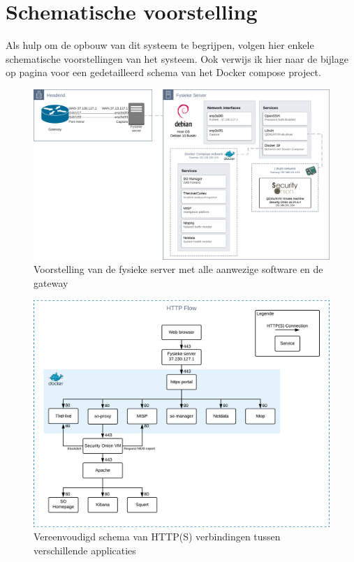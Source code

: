 \documentclass[a4paper,12pt]{report}
\begin{document}
\section{Schematische voorstelling}
Als hulp om de opbouw van dit systeem te begrijpen, volgen hier enkele schematische voorstellingen van het systeem.
Ook verwijs ik hier naar de bijlage op pagina \pageref{bijlage:aangepast-systeem-schema-docker} voor een gedetailleerd schema van het Docker compose project.

\begin{figure}[H]
  \centering
  \includegraphics[width=\textwidth]{aangepast-systeem-schema-server}
  \caption{Voorstelling van de fysieke server met alle aanwezige software en de gateway}
  \label{fig:aangepast-systeem-schema-server}
\end{figure}

\begin{figure}[H]
  \centering
  \includegraphics[width=\textwidth]{aangepast-systeem-schema-http}
  \caption{Vereenvoudigd schema van HTTP(S) verbindingen tussen verschillende applicaties}
  \label{fig:aangepast-systeem-schema-http}
\end{figure}
\end{document}
